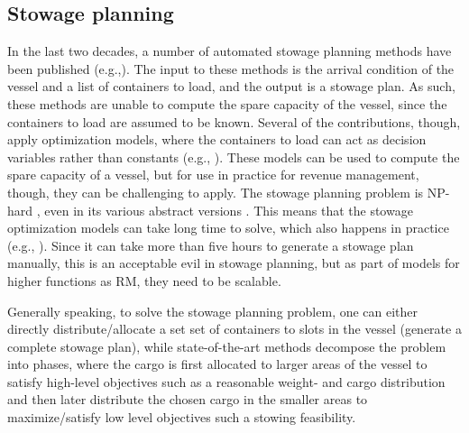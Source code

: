 \subsection{Stowage planning}
In the last two decades, a number of automated stowage planning methods have been published (e.g.,\cite{WR99,kimkang02,LTCD08,pacino11,APS15,PPAV16}). The input to these methods is the arrival condition of the vessel and a list of containers to load, and the output is a stowage plan. As such, these methods are unable to compute the spare capacity of the vessel, since the containers to load are assumed to be known. Several of the contributions, though, apply optimization models, where the containers to load can act as decision variables rather than constants (e.g., \cite{APS15,AlbertosThesis,pacino11}). These models can be used to compute the spare capacity of a vessel, but for use in practice for revenue management, though, they can be challenging to apply. The stowage planning problem is NP-hard \cite{APS00}, even in its various abstract versions \cite{Tierney14}. This means that the stowage optimization models can take long time to solve, which also happens in practice (e.g., \cite{pacino11}). Since it can take more than five hours to generate a stowage plan manually, this is an acceptable evil in stowage planning, but as part of models for higher functions as RM, they need to be scalable.

Generally speaking, to solve the stowage planning problem, one can either directly distribute/allocate a set set of containers to slots in the vessel (generate a complete stowage plan), while state-of-the-art methods decompose the problem into phases, where the cargo is first allocated to larger areas of the vessel to satisfy high-level objectives such as a reasonable weight- and cargo distribution and then later distribute the chosen cargo in the smaller areas to maximize/satisfy low level objectives such a stowing feasibility. 

